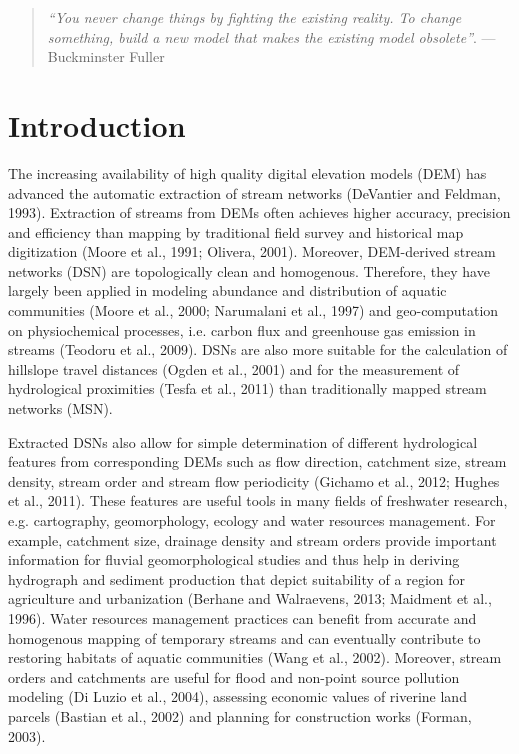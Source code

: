 \newpage
\thispagestyle{empty}

\vspace*{\fill}
\begin{quotation}
\centering
  \large\textit{``You never change things by fighting the existing reality. To change something, build a new model that makes the existing model obsolete''}.
   ---Buckminster Fuller
\end{quotation}
\vspace*{\fill} 

\newpage

\section{Introduction}
\label{introduction}

The increasing availability of high quality digital elevation models (DEM) has advanced the automatic extraction of stream networks (DeVantier and Feldman, 1993). Extraction of streams from DEMs often achieves higher accuracy, precision and efficiency than mapping by traditional field survey and historical map digitization (Moore et al., 1991; Olivera, 2001). Moreover, DEM-derived stream networks (DSN) are topologically clean and homogenous. Therefore, they have largely been applied in modeling abundance and distribution of aquatic communities (Moore et al., 2000; Narumalani et al., 1997) and geo-computation on physiochemical processes, i.e. carbon flux and greenhouse gas emission in streams (Teodoru et al., 2009). DSNs are also more suitable for the calculation of hillslope travel distances (Ogden et al., 2001) and for the measurement of hydrological proximities (Tesfa et al., 2011) than traditionally mapped stream networks (MSN).

Extracted DSNs also allow for simple determination of different hydrological features from corresponding DEMs such as flow direction, catchment size, stream density, stream order and stream flow periodicity (Gichamo et al., 2012; Hughes et al., 2011). These features are useful tools in many fields of freshwater research, e.g. cartography, geomorphology, ecology and water resources management. For example, catchment size, drainage density and stream orders provide important information for fluvial geomorphological studies and thus help in deriving hydrograph and sediment production that depict suitability of a region for agriculture and urbanization (Berhane and Walraevens, 2013; Maidment et al., 1996). Water resources management practices can benefit from accurate and homogenous mapping of temporary streams and can eventually contribute to restoring habitats of aquatic communities (Wang et al., 2002). Moreover, stream orders and catchments are useful for flood and non-point source pollution modeling (Di Luzio et al., 2004), assessing economic values of riverine land parcels (Bastian et al., 2002) and planning for construction works (Forman, 2003).

